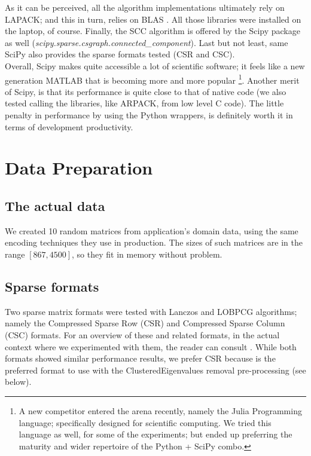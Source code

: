As it can be perceived, all the algorithm implementations ultimately
rely on LAPACK; and this in turn, relies on BLAS \cite{blas}. All
those libraries were installed on the laptop, of course. Finally, the
\gls{SCC} algorithm is offered by the Scipy package as well 
(\emph{scipy.sparse.csgraph.connected\_component}). Last but not least, same SciPy also provides the sparse formats tested (CSR and CSC). \\

Overall, Scipy makes quite accessible a lot of scientific
software; it feels like a new generation MATLAB that is becoming more
and more popular \footnote{A new competitor entered the arena
  recently, namely the Julia Programming language; specifically
  designed for scientific computing. We tried this language as well,
  for some of the experiments; but ended up preferring the maturity
  and wider repertoire of the Python + SciPy combo.}. Another merit of Scipy,
is that its performance is quite close to that of native code (we
also tested calling the libraries, like ARPACK, from low level C
code). The little penalty in performance by using the Python wrappers,
is definitely worth it in terms of development productivity. 

\section{Data Preparation}

\subsection{The actual data}
We created 10 random matrices from application's domain data, using
the same encoding techniques they use in production. The sizes of such
matrices are in the range $[867,4500]$, so they fit in memory without
problem. \\

\subsection{Sparse formats}
Two sparse matrix formats were tested with Lanczos and LOBPCG
algorithms; namely the Compressed Sparse Row (CSR) and Compressed
Sparse Column (CSC) formats. For an overview of these and related
formats, in the actual context where we experimented with them, the
reader can consult \cite{johansson15}. While both formats showed
similar performance results, we prefer CSR because is the preferred
format to use with the \gls{ClusteredEigenvalues} removal pre-processing (see
below). 

